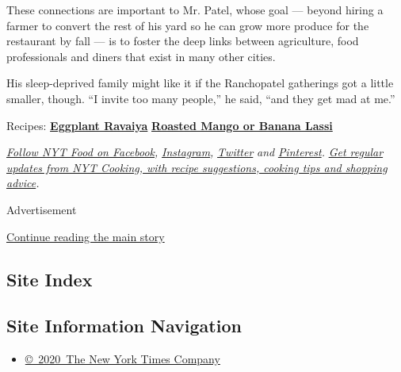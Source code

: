 These connections are important to Mr. Patel, whose goal --- beyond
hiring a farmer to convert the rest of his yard so he can grow more
produce for the restaurant by fall --- is to foster the deep links
between agriculture, food professionals and diners that exist in many
other cities.

His sleep-deprived family might like it if the Ranchopatel gatherings
got a little smaller, though. ``I invite too many people,'' he said,
``and they get mad at me.''

Recipes:
\href{https://cooking.nytimes3xbfgragh.onion/recipes/1018887-eggplant-ravaiya}{\textbf{Eggplant
Ravaiya}} \textbar{}
\href{https://cooking.nytimes3xbfgragh.onion/recipes/1018886-roasted-mango-or-banana-lassi}{\textbf{Roasted
Mango or Banana Lassi}}

\href{https://www.facebookcorewwwi.onion/nytfood/}{\emph{Follow NYT Food
on Facebook}}\emph{,}
\href{https://instagram.com/nytfood}{\emph{Instagram}}\emph{,}
\href{https://twitter.com/nytfood}{\emph{Twitter}} \emph{and}
\href{https://www.pinterest.com/nytfood/}{\emph{Pinterest}}\emph{.}
\href{https://www.nytimes3xbfgragh.onion/newsletters/cooking}{\emph{Get
regular updates from NYT Cooking, with recipe suggestions, cooking tips
and shopping advice}}\emph{.}

Advertisement

\protect\hyperlink{after-bottom}{Continue reading the main story}

\hypertarget{site-index}{%
\subsection{Site Index}\label{site-index}}

\hypertarget{site-information-navigation}{%
\subsection{Site Information
Navigation}\label{site-information-navigation}}

\begin{itemize}
\tightlist
\item
  \href{https://help.nytimes3xbfgragh.onion/hc/en-us/articles/115014792127-Copyright-notice}{©~2020~The
  New York Times Company}
\end{itemize}

